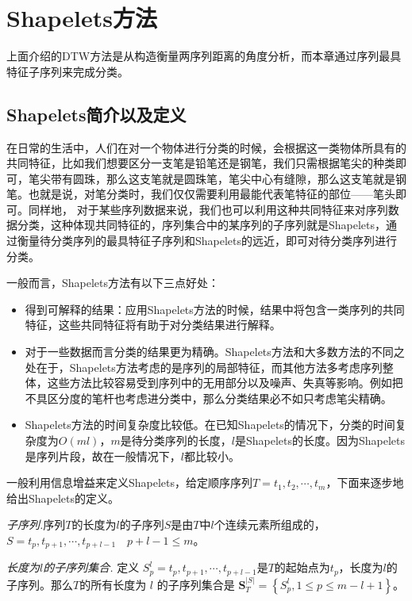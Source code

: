 \chapter{Shapelets方法}
上面介绍的DTW方法是从构造衡量两序列距离的角度分析，而本章通过序列最具特征子序列来完成分类。
\section{Shapelets简介以及定义}
在日常的生活中，人们在对一个物体进行分类的时候，会根据这一类物体所具有的共同特征，比如我们想要区分一支笔是铅笔还是钢笔，我们只需根据笔尖的种类即可，笔尖带有圆珠，那么这支笔就是圆珠笔，笔尖中心有缝隙，那么这支笔就是钢笔。也就是说，对笔分类时，我们仅仅需要利用最能代表笔特征的部位——笔头即可。同样地，  对于某些序列数据来说，我们也可以利用这种共同特征来对序列数据分类，这种体现共同特征的，序列集合中的某序列的子序列就是Shapelets\cite{Ye2009}，通过衡量待分类序列的最具特征子序列和Shapelets的远近，即可对待分类序列进行分类。

一般而言，Shapelets方法有以下三点好处：
\begin{itemize}
  \item 得到可解释的结果：应用Shapelets方法的时候，结果中将包含一类序列的共同特征，这些共同特征将有助于对分类结果进行解释。
  \item 对于一些数据而言分类的结果更为精确。Shapelets方法和大多数方法的不同之处在于，Shapelets方法考虑的是序列的局部特征，而其他方法多考虑序列整体，这些方法比较容易受到序列中的无用部分以及噪声、失真等影响。例如把不具区分度的笔杆也考虑进分类中，那么分类结果必不如只考虑笔尖精确。
  \item Shapelets方法的时间复杂度比较低。在已知Shapelets的情况下，分类的时间复杂度为$O(ml)$，$m$是待分类序列的长度，$l$是Shapelets的长度。因为Shapelets是序列片段，故在一般情况下，$l$都比较小。
\end{itemize}

一般利用信息增益来定义Shapelets，给定顺序序列$T = t_1,t_2,\cdots ,t_m$，下面来逐步地给出Shapelets的定义。

\begin{mydef}
\emph{子序列.}序列$T$的长度为$l$的子序列$S$是由$T$中$l$个连续元素所组成的，$S = t_p,t_{p+1},\cdots,t_{p+l-1} \quad p+l-1 \leq m$。
\end{mydef}

\begin{mydef}
\emph{长度为$l$的子序列集合.} 定义 $S_p^l = {t_p},{t_{p + 1}}, \cdots ,{t_{p + l - 1}}$是$T$的起始点为$t_p$，长度为$l$的子序列。那么$T$的所有长度为 $l$ 的子序列集合是 $\bm{S}_T^{\left| S \right|} = \left\{ {S_p^l,1 \le p \le m - l + 1} \right\}$。
\end{mydef}

